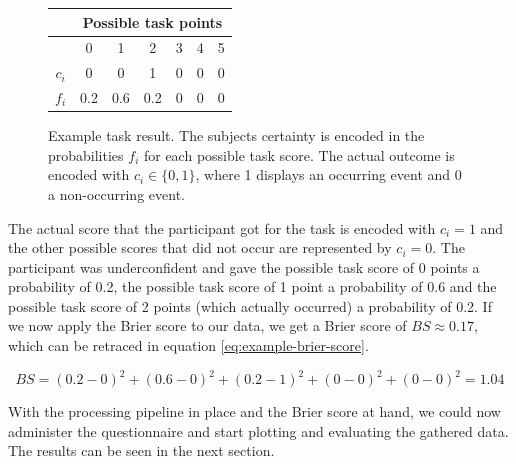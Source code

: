 \documentclass[../main/main.tex]{subfiles}
\begin{document}
	\begin{figure}[h]
		\centering
		\begin{tabular}{c|c|c|c|c|c|c|}
			& \multicolumn{6}{c|}{Possible task points} \\
			\hline
			& 0 & 1 & 2 & 3 & 4 & 5 \\
			\hline
			$c_i$ & 0 & 0 & 1 & 0 & 0 & 0 \\
			$f_i$ & 0.2 & 0.6 & 0.2 & 0 & 0 & 0\\
		\end{tabular}
		\caption{Example task result. The subjects certainty is encoded in the probabilities $f_i$ for each possible task score. The actual outcome is encoded with $c_i \in \{0, 1\}$, where 1 displays an occurring event and 0 a non-occurring event.}
		\label{fig:example}
	\end{figure}

	\noindent The actual score that the participant got for the task is encoded with $c_i = 1$ and the other possible scores that did not occur are represented by $c_i = 0$. The participant was underconfident and gave the possible task score of 0 points a probability of 0.2, the possible task score of 1 point a probability of 0.6 and the possible task score of 2 points (which actually occurred) a probability of 0.2. If we now apply the Brier score to our data, we get a Brier score of $BS \approx 0.17$, which can be retraced in equation \ref{eq:example-brier-score}.
	
	\begin{equation}
		\label{eq:example-brier-score}
		BS = (0.2 - 0)^2 + (0.6 - 0)^2 + (0.2 - 1)^2 + (0 - 0)^2 + (0 - 0)^2 = 1.04
	\end{equation}
	
	\noindent With the processing pipeline in place and the Brier score at hand, we could now administer the questionnaire and start plotting and evaluating the gathered data. The results can be seen in the next section.
\end{document}
